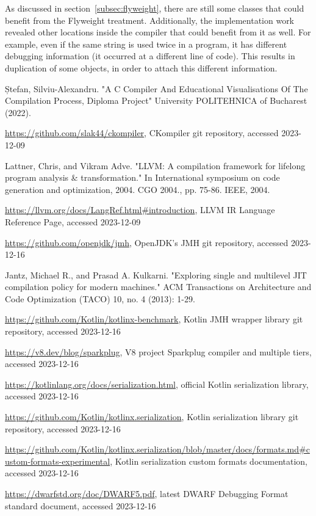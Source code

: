 \documentclass[lettersize,journal]{IEEEtran}
\begin{document}
    As discussed in section~\ref{subsec:flyweight}, there are still some classes that could benefit from the Flyweight
    treatment.
    Additionally, the implementation work revealed other locations inside the compiler that could benefit from it as
    well.
    For example, even if the same string is used twice in a program, it has different debugging information (it occurred
    at a different line of code).
    This results in duplication of some objects, in order to attach this different information.

    \begin{thebibliography}{1}
        

        Ștefan, Silviu-Alexandru. "A C Compiler And Educational Visualisations Of The Compilation Process, Diploma Project" University POLITEHNICA of Bucharest (2022).

        \url{https://github.com/slak44/ckompiler}, CKompiler git repository, accessed 2023-12-09

        Lattner, Chris, and Vikram Adve. "LLVM: A compilation framework for lifelong program analysis \& transformation." In International symposium on code generation and optimization, 2004. CGO 2004., pp. 75-86. IEEE, 2004.

        \url{https://llvm.org/docs/LangRef.html\#introduction}, LLVM IR Language Reference Page, accessed 2023-12-09

        \url{https://github.com/openjdk/jmh}, OpenJDK's JMH git repository, accessed 2023-12-16

        Jantz, Michael R., and Prasad A. Kulkarni. "Exploring single and multilevel JIT compilation policy for modern machines." ACM Transactions on Architecture and Code Optimization (TACO) 10, no. 4 (2013): 1-29.

        \url{https://github.com/Kotlin/kotlinx-benchmark}, Kotlin JMH wrapper library git repository, accessed 2023-12-16

        \url{https://v8.dev/blog/sparkplug}, V8 project Sparkplug compiler and multiple tiers, accessed 2023-12-16

        \url{https://kotlinlang.org/docs/serialization.html}, official Kotlin serialization library, accessed 2023-12-16

        \url{https://github.com/Kotlin/kotlinx.serialization}, Kotlin serialization library git repository, accessed 2023-12-16

        \url{https://github.com/Kotlin/kotlinx.serialization/blob/master/docs/formats.md\#custom-formats-experimental}, Kotlin serialization custom formats documentation, accessed 2023-12-16

        \url{https://dwarfstd.org/doc/DWARF5.pdf}, latest DWARF Debugging Format standard document, accessed 2023-12-16

    \end{thebibliography}
\end{document}
